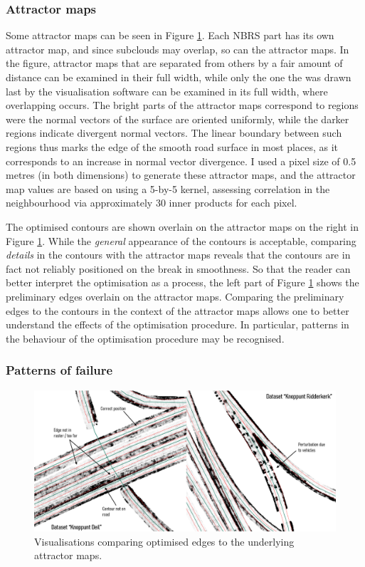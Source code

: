 \subsubsection{Attractor maps}

Some attractor maps can be seen in Figure \ref{fig:activecontouroptimisation1}. Each NBRS part has its own attractor map, and since subclouds may overlap, so can the attractor maps. In the figure, attractor maps that are separated from others by a fair amount of distance can be examined in their full width, while only the one the was drawn last by the visualisation software can be examined in its full width, where overlapping occurs. The bright parts of the attractor maps correspond to regions were the normal vectors of the surface are oriented uniformly, while the darker regions indicate divergent normal vectors. The linear boundary between such regions thus marks the edge of the smooth road surface in most places, as it corresponds to an increase in normal vector divergence. I used a pixel size of 0.5 metres (in both dimensions) to generate these attractor maps, and the attractor map values are based on using a 5-by-5 kernel, assessing correlation in the neighbourhood via approximately 30 inner products for each pixel.

The optimised contours are shown overlain on the attractor maps on the right in Figure \ref{fig:activecontouroptimisation1}. While the \textit{general} appearance of the contours is acceptable, comparing \textit{details} in the contours with the attractor maps reveals that the contours are in fact not reliably positioned on the break in smoothness. So that the reader can better interpret the optimisation as a process, the left part of Figure \ref{fig:activecontouroptimisation1} shows the preliminary edges overlain on the attractor maps. Comparing the preliminary edges to the contours in the context of the attractor maps allows one to better understand the effects of the optimisation procedure. In particular, patterns in the behaviour of the optimisation procedure may be recognised.

\subsubsection{Patterns of failure}

\begin{figure}[]
    \centering
    \includegraphics[width=0.9\linewidth]{final_report/figs/activecontouroptimisation1.png}
    \caption{Visualisations comparing optimised edges to the underlying attractor maps.}
    \label{fig:activecontouroptimisation1}
\end{figure}

